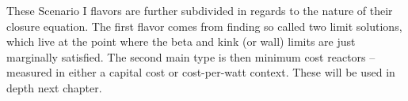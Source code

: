  These Scenario I flavors are further subdivided in regards to the nature of their closure equation. The first flavor comes from finding so called two limit solutions, which live at the point where the beta and kink (or wall) limits are just marginally satisfied. The second main type is then minimum cost reactors -- measured in either a capital cost or cost-per-watt context. These will be used in depth next chapter.
 
%
